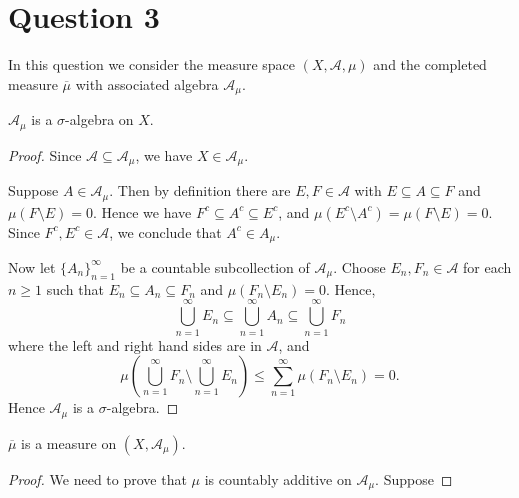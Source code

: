 \documentclass{unswmaths}
\begin{document}
\section*{Question 3}
In this question we consider the measure space $(X,\mathcal{A},\mu)$
and the completed measure $\overline{\mu}$ with associated
algebra $\mathcal{A}_\mu$.
\begin{lemma}
    $\mathcal{A}_\mu$ is a $\sigma$-algebra on $X$.    
\end{lemma}
\begin{proof}
    Since $\mathcal{A} \subseteq \mathcal{A}_\mu$, we have $X \in \mathcal{A}_\mu$.
    
    Suppose $A \in \mathcal{A}_\mu$. Then by definition there are $E,F \in \mathcal{A}$
    with $E \subseteq A \subseteq F$ and $\mu(F \setminus E) = 0$. Hence we 
    have $F^c \subseteq A^c \subseteq E^c$, and $\mu(E^c \setminus A^c) = \mu(F\setminus E) = 0$.
    Since $F^c, E^c \in \mathcal{A}$, we conclude that $A^c \in A_\mu$.
    
    Now let $\{A_n\}_{n=1}^\infty$ be a countable subcollection of $\mathcal{A}_\mu$. 
    Choose $E_n, F_n \in \mathcal{A}$ for each $n\geq 1$ such that $E_n \subseteq A_n \subseteq F_n$
    and $\mu(F_n\setminus E_n) = 0$.
    Hence,
    \begin{equation*}
        \bigcup_{n=1}^\infty E_n \subseteq \bigcup_{n=1}^\infty A_n \subseteq \bigcup_{n=1}^\infty F_n
    \end{equation*}
    where the left and right hand sides are in $\mathcal{A}$, and
    \begin{equation*}
        \mu(\bigcup_{n=1}^\infty F_n \setminus \bigcup_{n=1}^\infty E_n) \leq \sum_{n=1}^\infty \mu(F_n\setminus E_n) = 0.
    \end{equation*}
    Hence $\mathcal{A}_\mu$ is a $\sigma$-algebra.    
\end{proof}

\begin{lemma}
    $\overline{\mu}$ is a measure on $(X,\mathcal{A}_\mu)$.
\end{lemma}
\begin{proof}
    We need to prove that $\mu$ is countably additive on $\mathcal{A}_\mu$. Suppose
    
   
\end{proof} 
\end{document}
